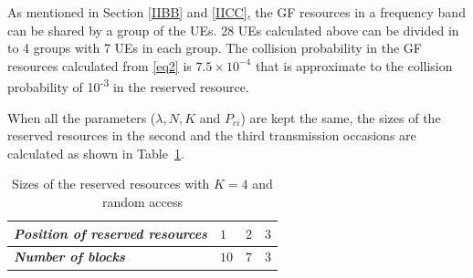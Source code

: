 \documentclass[conference]{IEEEtran}
\begin{document}

As mentioned in Section \ref{IIBB} and \ref{IICC}, the GF resources in a frequency band can be shared by a group of the UEs. 28 UEs calculated above can be divided in to 4 groups with 7 UEs in each group. The collision probability in the GF resources calculated from \eqref{eq2} is $7.5\times10^{-4}$ that is approximate to the collision probability of 10\textsuperscript{-3} in the reserved resource.

When all the parameters ($\lambda, N, K$ and $P_{ci}$) are kept the same, the sizes of the reserved resources in the second and the third transmission occasions are calculated as shown in Table~\ref{tab1}.
\begin{table}[htbp]
\caption{Sizes of the reserved resources with $K=4$ and random access}
\begin{center}
\begin{tabular}{|p{10em}|p{2em}|p{2em}|p{2em}|}
 \hline
 \textbf{\textit{Position of reserved resources}} & $1$ &$2$ &$3$ \\ 
 \hline
 \textbf{\textit{Number of blocks}} & $10$ &$7$ &$3$ \\

 
 \hline
\end{tabular}
\label{tab1}
\end{center}
\vspace{-6mm}
\end{table}
\end{document}
